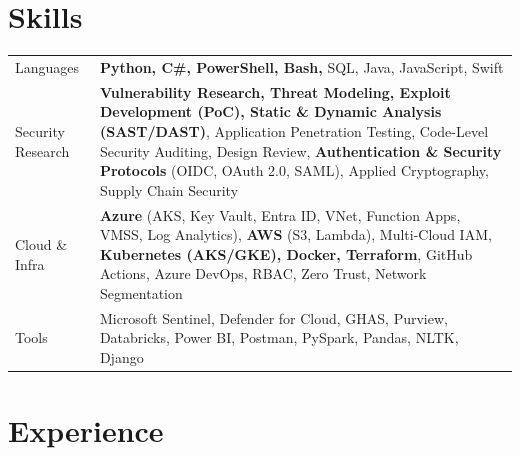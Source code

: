 \documentclass[a4paper,3pt]{article}
\begin{document}
\section{Skills}
\begin{tabularx}{\linewidth}{@{}l X@{}}
    Languages           & \normalsize{\textbf{Python, C\#, PowerShell, Bash,} SQL, Java, JavaScript, Swift}\\
    Security Research   & \normalsize{\textbf{Vulnerability Research, Threat Modeling, Exploit Development (PoC), Static \& Dynamic Analysis (SAST/DAST)}, Application Penetration Testing, Code-Level Security Auditing, Design Review, \textbf{Authentication \& Security Protocols} (OIDC, OAuth 2.0, SAML), Applied Cryptography, Supply Chain Security}\\
    Cloud \& Infra      & \normalsize{\textbf{Azure} (AKS, Key Vault, Entra ID, VNet, Function Apps, VMSS, Log Analytics), \textbf{AWS} (S3, Lambda), Multi-Cloud IAM, \textbf{Kubernetes (AKS/GKE), Docker, Terraform}, GitHub Actions, Azure DevOps, RBAC, Zero Trust, Network Segmentation}\\
    Tools               & \normalsize{Microsoft Sentinel, Defender for Cloud, GHAS, Purview, Databricks, Power BI, Postman, PySpark, Pandas, NLTK, Django}
\end{tabularx}


\section{Experience}
\end{document}
